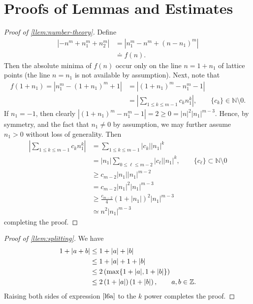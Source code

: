 \section{Proofs of Lemmas and Estimates}
\begin{proof}[Proof of \cref{llem:number-theory}] Define
%
\begin{equation*}
	\begin{split}
		| - n^{m} + n_1^{m} + n_2^{m }|
		& = | n_{1}^{m} - n^{m} + (n-n_{1})^{m}| 
		\\
		& \doteq f(n).
	\end{split}
\end{equation*}
%
%
Then the absolute minima
of $f(n)$ occur only on the line $n = 1+n_{1}$ of lattice points 
(the line $n = n_1$ is not available by assumption). Next, note that
%
%
\begin{equation*}
	\begin{split}
		f(1+ n_{1}) = | n_{1}^{m} - (1 + n_{1})^m + 1 |
		& = | (1 + n_{1} )^{m} - n_{1}^{m} -1 |
		\\
		& = | \sum_{1 \le k \le m-1} c_{k} n_1^{k}|, \qquad \{c_k\} \in \mathbb{N}
		\setminus 0.
	\end{split}
\end{equation*}
If $n_1 = -1$, then clearly $| (1 + n_{1})^m - n_1^m -1 | = 2 \ge 0 = |n|^2
|n_1|^{m-3}$. Hence, by symmetry, and the fact that $n_1 \neq 0$ by assumption,
we may further assume
$n_1 >0$ without loss of generality.
Then 
%
%
\begin{equation*}
	\begin{split}
	  | \sum_{1 \le k \le m-1} c_{k} n_1^{k}|
	 & = \sum_{1 \le k \le m-1} |c_{k}| |n_1|^{k}
	 \\
	 & = |n_1| \sum_{0 \le \ell \le m-2} |c_{\ell}| |n_1|^{k}, \qquad \{c_\ell\}
	 \subset \mathbb{N} \setminus 0
	 \\
	 & \ge c_{m-2}|n_1| | n_1|^{m-2}
	 \\
	 & = c_{m-2}| n_1 |^2 | n_1 |^{m-3}
	 \\
	 & \ge \frac{c_{m-2}}{4} (1 + | n_1 |)^2 | n_1|^{m-3}
	 \\
	 & \simeq n^2 | n_1 |^{m-3}
	\end{split}
\end{equation*}
%
%
completing the proof. 
\end{proof}
%
%
%
\begin{proof}[Proof of \cref{llem:splitting}] We have
%
%
\begin{equation}
	\label{l6a}
	\begin{split}
		1 + | a + b | 
		& \le 1 + | a | + | b | 
		\\
		& \le 1 + | a | + 1 + | b | 
		\\
		& \le 2\left( \max\{1+| a |, 1+| b | \}\right)
		\\
		& \le 2 \left( 1 + | a | \right)\left( 1 + | b | \right), \qquad a, b \in {\mathbb{Z}}.
	\end{split}
\end{equation}
%
%
Raising both sides of expression $\eqref{l6a}$ to the $k$ power completes 
the proof. 
\end{proof}
